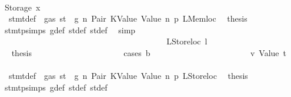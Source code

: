 \begin{isabellebody}
\ \ \ \ \ \ \ \ \ \ \ \ \ \ \ \ \ \ \ \ \ \ \isamarkupfalse%
\isanewline
\ \ \ \ \ \ \ \ \ \ \ \ \ \ \ \ \ \ \ \ \isamarkupfalse%
\isanewline
\ \ \ \ \ \ \ \ \ \ \ \ \ \ \ \ \ \ \ \ \ \ \isamarkupfalse%
\ {\isacharparenleft}{\kern0pt}Storage\ x{}{\isacharparenright}{\kern0pt}\isanewline
\ \ \ \ \ \ \ \ \ \ \ \ \ \ \ \ \ \ \ \ \ \ \isamarkupfalse%
\ {}{\isacharparenleft}{\kern0pt}{}{\isacharparenright}{\kern0pt}\ stmt{\isacharunderscore}{\kern0pt}def\ {\isacharbackquoteopen}{\isasymnot}\ gas\ st\ {\isasymle}\ g{\isacharbackquoteclose}\ n\ Pair\ KValue\ Value\ n{}\ p{}\ LMemloc\ \isamarkupfalse%
\ {\isacharquery}{\kern0pt}thesis\ \isamarkupfalse%
\ stmt{\isachardot}{\kern0pt}psimps{\isacharparenleft}{\kern0pt}{}{\isacharparenright}{\kern0pt}\ g{\isacharunderscore}{\kern0pt}def\ st{\isacharprime}{\kern0pt}{\isacharunderscore}{\kern0pt}def\ st{\isacharprime}{\kern0pt}{\isacharprime}{\kern0pt}{\isacharunderscore}{\kern0pt}def\ \isamarkupfalse%
\ simp\isanewline
\ \ \ \ \ \ \ \ \ \ \ \ \ \ \ \ \ \ \ \ \isamarkupfalse%
\isanewline
\ \ \ \ \ \ \ \ \ \ \ \ \ \ \ \ \ \ \isamarkupfalse%
\isanewline
\ \ \ \ \ \ \ \ \ \ \ \ \ \ \ \ \ \ \ \ \isamarkupfalse%
\ {\isacharparenleft}{\kern0pt}LStoreloc\ l{\isacharparenright}{\kern0pt}\isanewline
\ \ \ \ \ \ \ \ \ \ \ \ \ \ \ \ \ \ \ \ \isamarkupfalse%
\ \isamarkupfalse%
\ {\isacharquery}{\kern0pt}thesis\isanewline
\ \ \ \ \ \ \ \ \ \ \ \ \ \ \ \ \ \ \ \ \isamarkupfalse%
\ {\isacharparenleft}{\kern0pt}cases\ b{\isacharparenright}{\kern0pt}\isanewline
\ \ \ \ \ \ \ \ \ \ \ \ \ \ \ \ \ \ \ \ \ \ \isamarkupfalse%
\ v{}{\isacharcolon}{\kern0pt}\ {\isacharparenleft}{\kern0pt}Value\ t{\isacharprime}{\kern0pt}{\isacharparenright}{\kern0pt}\isanewline
\ \ \ \ \ \ \ \ \ \ \ \ \ \ \ \ \ \ \ \ \ \ \isamarkupfalse%
\ {}{\isacharparenleft}{\kern0pt}{}{\isacharparenright}{\kern0pt}\ stmt{\isacharunderscore}{\kern0pt}def\ {\isacharbackquoteopen}{\isasymnot}\ gas\ st\ {\isasymle}\ g{\isacharbackquoteclose}\ n\ Pair\ KValue\ Value\ n{}\ p{}\ LStoreloc\ \isamarkupfalse%
\ {\isacharquery}{\kern0pt}thesis\ \isamarkupfalse%
\ stmt{\isachardot}{\kern0pt}psimps{\isacharparenleft}{\kern0pt}{}{\isacharparenright}{\kern0pt}\ g{\isacharunderscore}{\kern0pt}def\ st{\isacharprime}{\kern0pt}{\isacharunderscore}{\kern0pt}def\ st{\isacharprime}{\kern0pt}{\isacharprime}{\kern0pt}{\isacharunderscore}{\kern0pt}def\ \isamarkupfalse%

\end{isabellebody}
